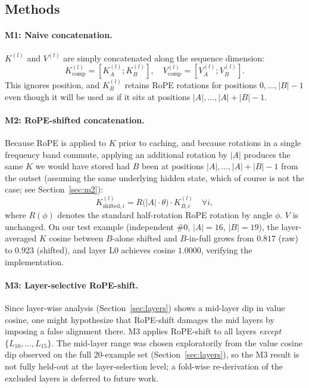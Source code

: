 \subsection{Methods}

\paragraph{M1: Naive concatenation.} $K^{(l)}$ and $V^{(l)}$ are simply concatenated along the sequence dimension:
\[
K^{(l)}_{\text{comp}} = [K^{(l)}_A ; K^{(l)}_B],
\quad
V^{(l)}_{\text{comp}} = [V^{(l)}_A ; V^{(l)}_B].
\]
This ignores position, and $K^{(l)}_B$ retains RoPE rotations for positions $0, \dots, |B|-1$ even though it will be used as if it sits at positions $|A|, \dots, |A|+|B|-1$.

\paragraph{M2: RoPE-shifted concatenation.} Because RoPE is applied to $K$ prior to caching, and because rotations in a single frequency band commute, applying an additional rotation by $|A|$ produces the same $K$ we would have stored had $B$ been at positions $|A|, \dots, |A|+|B|-1$ from the outset (assuming the same underlying hidden state, which of course is not the case; see Section~\ref{sec:m2}):
\[
K^{(l)}_{\text{shifted}, i} = R\bigl( |A| \cdot \theta \bigr) \cdot K^{(l)}_{B, i}
\quad \forall i,
\]
where $R(\phi)$ denotes the standard half-rotation RoPE rotation by angle $\phi$. $V$ is unchanged. On our test example (independent \#0, $|A|=16$, $|B|=19$), the layer-averaged $K$ cosine between $B$-alone shifted and $B$-in-full grows from $0.817$ (raw) to $0.923$ (shifted), and layer L0 achieves cosine $1.0000$, verifying the implementation.

\paragraph{M3: Layer-selective RoPE-shift.} Since layer-wise analysis (Section~\ref{sec:layers}) shows a mid-layer dip in value cosine, one might hypothesize that RoPE-shift damages the mid layers by imposing a false alignment there. M3 applies RoPE-shift to all layers \emph{except} $\{L_{10}, \ldots, L_{15}\}$. The mid-layer range was chosen exploratorily from the value cosine dip observed on the full 20-example set (Section~\ref{sec:layers}), so the M3 result is not fully held-out at the layer-selection level; a fold-wise re-derivation of the excluded layers is deferred to future work.


